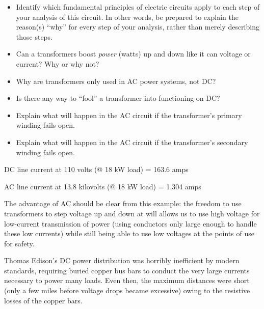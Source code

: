 \begin{itemize}
\item{} Identify which fundamental principles of electric circuits apply to each step of your analysis of this circuit.  In other words, be prepared to explain the reason(s) ``why'' for every step of your analysis, rather than merely describing those steps.
\item{} Can a transformers boost {\it power} (watts) up and down like it can voltage or current?  Why or why not?
\item{} Why are transformers only used in AC power systems, not DC?
\item{} Is there any way to ``fool'' a transformer into functioning on DC?
\item{} Explain what will happen in the AC circuit if the transformer's primary winding fails open.
\item{} Explain what will happen in the AC circuit if the transformer's secondary winding fails open.
\end{itemize}







DC line current at 110 volts (@ 18 kW load) = 163.6 amps

\vskip 10pt

AC line current at 13.8 kilovolts (@ 18 kW load) = 1.304 amps

\vskip 10pt

The advantage of AC should be clear from this example: the freedom to use transformers to step voltage up and down at will allows us to use high voltage for low-current transmission of power (using conductors only large enough to handle these low currents) while still being able to use low voltages at the points of use for safety.

Thomas Edison's DC power distribution was horribly inefficient by modern standards, requiring buried copper bus bars to conduct the very large currents necessary to power many loads.  Even then, the maximum distances were short (only a few miles before voltage drops became excessive) owing to the resistive losses of the copper bars.












